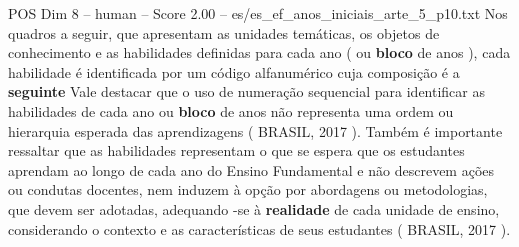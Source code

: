 \begin{textsample}{POS Dim 8 – human – Score 2.00 – es/es\_ef\_anos\_iniciais\_arte\_5\_p10.txt}  \label{ex:f8_pos_016}
Nos quadros a seguir, que apresentam as unidades temáticas, os objetos de conhecimento e as habilidades definidas para cada ano ( ou \textbf{bloco} de anos ), cada habilidade é identificada por um código alfanumérico cuja composição é a \textbf{seguinte} Vale destacar que o uso de numeração sequencial para identificar as habilidades de cada ano ou \textbf{bloco} de anos não representa uma ordem ou hierarquia esperada das aprendizagens ( BRASIL, 2017 ).
Também é importante ressaltar que as habilidades representam o que se espera que os estudantes aprendam ao longo de cada ano do Ensino Fundamental e não descrevem ações ou condutas docentes, nem induzem à opção por abordagens ou metodologias, que devem ser adotadas, adequando -se à \textbf{realidade} de cada unidade de ensino, considerando o contexto e as características de seus estudantes ( BRASIL, 2017 ).

\end{textsample}
